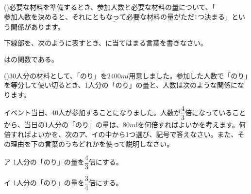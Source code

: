 \documentclass[
  12pt,a4paper,lualatex,ja=standard]{bxjsarticle}
\begin{document}
\begin{flushleft}
()\hspace{2.5pt}必要な材料を準備するとき、参加人数と必要な材料の量について、「$\underline{参加人数を決めると、それにともなって必要な材料の量がただ1つ決まる}$」という関係があります。

\hspace*{2em}下線部を、次のように表すとき、\fbox{\phantom{あああ}}に当てはまる言葉を書きなさい。

\begin{center}
\fbox{\phantom{材料の量}}は\fbox{\phantom{参加人数}}の関数である。
\end{center}

\vfill

()\hspace{2.5pt}30人分の材料として、「のり」を$2400\si{ml}$用意しました。参加した人数で「のり」を等分して使い切るとき、1人分の「のり」の量と、人数は次のような関係になります。

\begin{center}
\end{center}


\hspace*{1em} イベント当日、40人が参加することになりました。人数が$\dfrac{4}{3}$倍になっていることから、当日の1人分の「のり」の量は、$80\si{ml}$を何倍すればよいかを考えます。何倍すればよいかを、次のア、イの中から1つ選び、記号で答えなさい。また、その理由を下の言葉のうちどれかを使って説明しなさい。

\begin{center}
\end{center}

\hspace*{1em} ア \hspace{1em} 1人分の「のり」の量を$\dfrac{4}{3}$倍にする。

\hspace*{1em} イ \hspace{1em} 1人分の「のり」の量を$\dfrac{3}{4}$倍にする。

\vfill

\end{flushleft}
\end{document}
